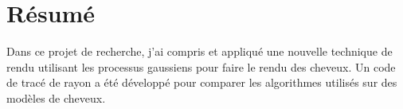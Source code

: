 \section*{Résumé}

Dans ce projet de recherche, j'ai compris et appliqué une nouvelle technique de rendu utilisant les processus gaussiens pour faire le rendu des cheveux. Un code de tracé de rayon a été développé pour comparer les algorithmes utilisés sur des modèles de cheveux.
